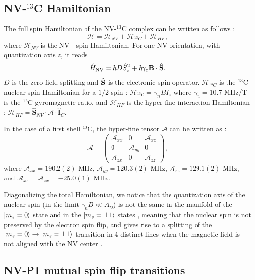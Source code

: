 \documentclass[9pt,twocolumn,twoside]{revtex4-1}
\begin{document}
\subsection{NV-$^{13}$C Hamiltonian}

The full spin Hamiltonian of the NV-$^{13}$C complex can be written as follows : 
\begin{equation*}
\mathcal{H}=\mathcal{H}_{NV}+\mathcal{H}_{^{13}C}+\mathcal{H}_{HF},
\end{equation*}
where $\mathcal{H}_{NV}$ is the NV$^-$ spin Hamiltonian.
For one NV orientation, with quantization axis $z$, it reads 
\begin{equation}\hat{H}_{\rm NV}=\hbar D \hat{S}_z^2+ \hbar \gamma_e \bf B  \cdot \bf\hat S.
\end{equation}
$D$ is the zero-field-splitting and $\bf\hat S$ is the electronic spin operator.
$\mathcal{H}_{^{13}C}$ is the $^{13}$C nuclear spin Hamiltonian for a $1/2$ spin : $\mathcal{H}_{^{13}C}=\gamma_{n} B I_z$ where $\gamma_{n}=$10.7 MHz/T is the $^{13}$C gyromagnetic ratio, and $\mathcal{H}_{HF}$ is the hyper-fine interaction Hamiltonian : $\mathcal{H}_{HF}= \hat{\mathbf{S}}_{NV} \cdot \mathcal{A} \cdot \hat{\mathbf{I}}_C$.

In the case of a first shell $^{13}$C, the hyper-fine tensor $\mathcal{A}$ can be written as \citep{simanovskaia_sidebands_2013} : $$ \mathcal{A} = \begin{pmatrix}
\mathcal{A}_{xx} & 0 & \mathcal{A}_{xz} \\ 0 & \mathcal{A}_{yy} & 0 \\ \mathcal{A}_{zx} & 0 & \mathcal{A}_{zz}
\end{pmatrix},$$
where $\mathcal{A}_{xx}=190.2(2)$ MHz, $\mathcal{A}_{yy}=120.3(2)$ MHz, $\mathcal{A}_{zz}=129.1(2)$ MHz, and  $\mathcal{A}_{xz}=\mathcal{A}_{zx}=-25.0(1)$ MHz. 

Diagonalizing the total Hamiltonian, we notice that the quantization axis of the nuclear spin (in the limit $\gamma_{n} B \ll A_{ij}$) is not the same in the manifold of the $\ket{m_s=0}$ state and in the $\ket{m_s=\pm 1}$ states \citep{alvarez_local_2015}, meaning that the nuclear spin is not preserved by the electron spin flip, and gives rise to a splitting of the $\ket{m_s=0} \to \ket{m_s=\pm 1}$ transition in 4 distinct lines when the magnetic field is not aligned with the NV center \citep{jiang2018estimation}.

\subsection{NV-P1 mutual spin flip transitions}
\end{document}
